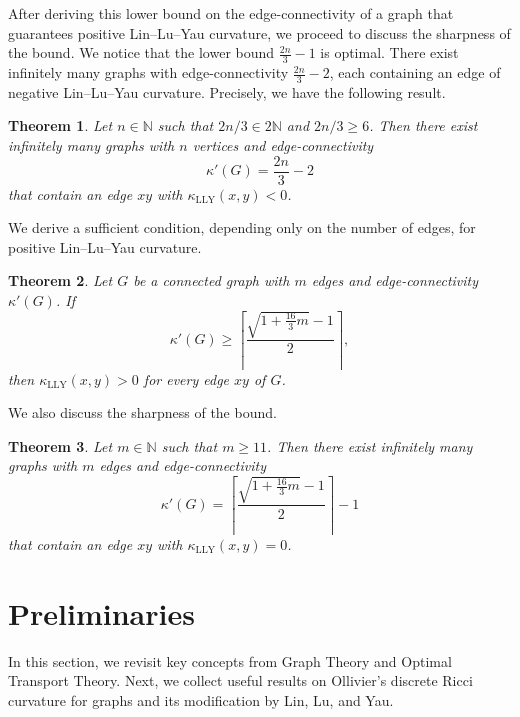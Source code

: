 \documentclass[11pt,bezier]{article}
\newtheorem{theorem}{Theorem}[section]
\theoremstyle{definition}
\theoremstyle{definition}
\theoremstyle{nonumber}
\begin{document}
After deriving this lower bound on the edge-connectivity of a graph that guarantees positive Lin--Lu--Yau curvature, we proceed to discuss the sharpness of the bound.
We notice that the lower bound $\frac{2n}{3}-1$ is optimal. There exist infinitely many graphs with edge-connectivity $\frac{2n}{3}-2$, each containing an edge of negative Lin--Lu--Yau curvature. Precisely, we have the following result.

\begin{theorem}\label{n bound sharpness}
Let $n \in \mathbb{N}$ such that $2n/3 \in 2\mathbb{N}$ and $2n/3 \geq 6$. Then there exist infinitely many graphs with $n$ vertices and edge-connectivity 
$$
\kappa'(G) = \frac{2n}{3} - 2
$$ 
that contain an edge $xy$ with $\kappa_{\mathrm{LLY}}(x, y) < 0$.
\end{theorem}

We derive a sufficient condition, depending only on the number of edges, for positive Lin--Lu--Yau curvature.

\begin{theorem}\label{m bound}
Let $G$ be a connected graph with $m$ edges and edge-connectivity $\kappa'(G)$. If $$
\kappa'(G)\ge \left\lceil\frac{\sqrt{1+\frac{16}{3}m}-1}{2}
\right\rceil,
$$ 
then $\kappa_{\mathrm{LLY}}(x,y)>0$ for every edge $xy$ of $G$.
\end{theorem}

We also discuss the sharpness of the bound.

\begin{theorem}\label{m bound sharpness}
Let $m \in \mathbb{N}$ such that $m \geq 11$. Then there exist infinitely many graphs with $m$ edges and edge-connectivity 
$$
\kappa'(G)=\left\lceil\frac{\sqrt{1+\frac{16}{3}m}-1}{2}\right\rceil-1
$$ 
that contain an edge $xy$ with $\kappa_{\mathrm{LLY}}(x, y) = 0$.
\end{theorem}

\section{Preliminaries}

In this section, we revisit key concepts from Graph Theory and Optimal Transport Theory.
Next, we collect useful results on Ollivier's discrete Ricci curvature for graphs and its modification by Lin, Lu, and Yau.
\end{document}
